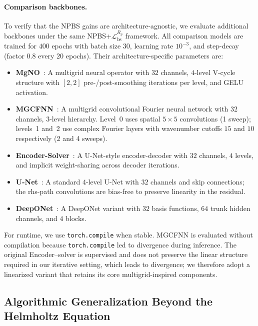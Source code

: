 \documentclass{article}
\theoremstyle{plain}
\theoremstyle{remark}
\begin{document}
\paragraph{Comparison backbones.}
To verify that the NPBS gains are architecture-agnostic, we evaluate additional backbones under the same NPBS+$\mathcal{L}_{\mathrm{bs}}^{R_\eta}$ framework. All comparison models are trained for $400$ epochs with batch size $30$, learning rate $10^{-3}$, and step-decay (factor $0.8$ every $20$ epochs). Their architecture-specific parameters are:
\begin{itemize}
    \item \textbf{MgNO}~\cite{he2024mgno}: A multigrid neural operator with $32$ channels, $4$-level V-cycle structure with $[2,2]$ pre-/post-smoothing iterations per level, and GELU activation.
    \item \textbf{MGCFNN}~\cite{xie2025mgcfnn}: A multigrid convolutional Fourier neural network with $32$ channels, $3$-level hierarchy. Level~0 uses spatial $5\times5$ convolutions (1 sweep); levels~1 and~2 use complex Fourier layers with wavenumber cutoffs $15$ and $10$ respectively (2 and 4 sweeps).
    \item \textbf{Encoder-Solver}~\cite{lerer2024multigrid}: A U-Net-style encoder-decoder with $32$ channels, $4$ levels, and implicit weight-sharing across decoder iterations.
    \item \textbf{U-Net}~\cite{ronneberger2015u}: A standard $4$-level U-Net with $32$ channels and skip connections; the rhs-path convolutions are bias-free to preserve linearity in the residual.
    \item \textbf{DeepONet}~\cite{lu2021learning}: A DeepONet variant with $32$ basis functions, $64$ trunk hidden channels, and $4$ blocks.
\end{itemize}
For runtime, we use \texttt{torch.compile} when stable. MGCFNN is evaluated without compilation because \texttt{torch.compile} led to divergence during inference. The original Encoder--solver is supervised and does not preserve the linear structure required in our iterative setting, which leads to divergence; we therefore adopt a linearized variant that retains its core multigrid-inspired components.

\subsection{Algorithmic Generalization Beyond the Helmholtz Equation}
\label{app:setup_generalization}
\end{document}
